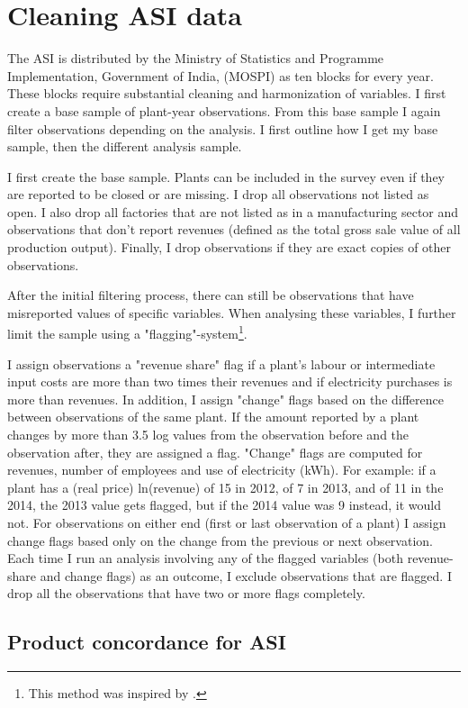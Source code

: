 \section{Cleaning ASI data}
The ASI is distributed by the Ministry of Statistics and Programme Implementation, Government of India, (MOSPI) as ten blocks for every year. These blocks require substantial cleaning and harmonization of variables. I first create a base sample of plant-year observations. From this base sample I again filter observations depending on the analysis. I first outline how I get my base sample, then the different analysis sample.

I first create the base sample. Plants can be included in the survey even if they are reported to be closed or are missing. I drop all observations not listed as open. I also drop all factories that are not listed as in a manufacturing sector and observations that don't report revenues (defined as the total gross sale value of all production output). Finally, I drop observations if they are exact copies of other observations.

After the initial filtering process, there can still be observations that have misreported values of specific variables. When analysing these variables, I further limit the sample using a "flagging"-system\footnote{This method was inspired by \cite{allcott_how_2016}.}. 

I assign observations a "revenue share" flag if a plant's labour or intermediate input costs are more than two times their revenues and if electricity purchases is more than revenues. In addition, I assign "change" flags based on the difference between observations of the same plant. If the amount reported by a plant changes by more than 3.5 log values from the observation before and the observation after, they are assigned a flag. "Change" flags are computed for revenues, number of employees and use of electricity (kWh). For example: if a plant has a (real price) ln(revenue) of 15 in 2012, of 7 in 2013, and of 11 in the 2014, the 2013 value gets flagged, but if the 2014 value was 9 instead, it would not. For observations on either end (first or last observation of a plant) I assign change flags based only on the change from the previous or next observation. Each time I run an analysis involving any of the flagged variables (both revenue-share and change flags) as an outcome, I exclude observations that are flagged. I drop all the observations that have two or more flags completely.

\subsection{Product concordance for ASI}%
\label{sub:product_concordance_asi}

